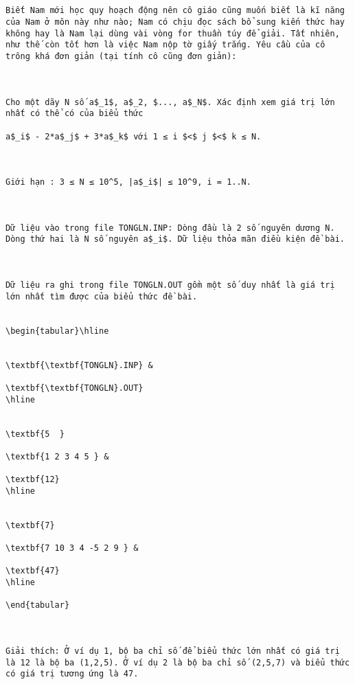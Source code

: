 
\begin{verbatim}


Biết Nam mới học quy hoạch động nên cô giáo cũng muốn biết là kĩ năng của Nam ở môn này như nào; Nam có chịu đọc sách bổ sung kiến thức hay không hay là Nam lại dùng vài vòng for thuần túy để giải. Tất nhiên, như thế còn tốt hơn là việc Nam nộp tờ giấy trắng. Yêu cầu của cô trông khá đơn giản (tại tính cô cũng đơn giản):

 

Cho một dãy N số a$_1$, a$_2­, $..., a­$_N$. Xác định xem giá trị lớn nhất có thể có của biểu thức

a$_i$ - 2*a$_j$ + 3*a$_k$ với 1 ≤ i $<$ j $<$ k ≤ N.

 

Giới hạn : 3 ≤ N ≤ 10^5, |a$_i$| ≤ 10^9, i = 1..N.

 

Dữ liệu vào trong file TONGLN.INP: Dòng đầu là 2 số nguyên dương N.  Dòng thứ hai là N số nguyên a$_i$. Dữ liệu thỏa mãn điều kiện đề bài.

 

Dữ liệu ra ghi trong file TONGLN.OUT gồm một số duy nhất là giá trị lớn nhất tìm được của biểu thức đề bài.

 
\begin{tabular}\hline 


\textbf{\textbf{TONGLN}.INP} & 

\textbf{\textbf{TONGLN}.OUT}  
\hline


\textbf{5  }

\textbf{1 2 3 4 5 } & 

\textbf{12}  
\hline


\textbf{7}

\textbf{7 10 3 4 -5 2 9 } & 

\textbf{47}  
\hline

\end{tabular}

 

Giải thích: Ở ví dụ 1, bộ ba chỉ số để biểu thức lớn nhất có giá trị là 12 là bộ ba (1,2,5). Ở ví dụ 2 là bộ ba chỉ số (2,5,7) và biểu thức có giá trị tương ứng là 47.\end{verbatim}
